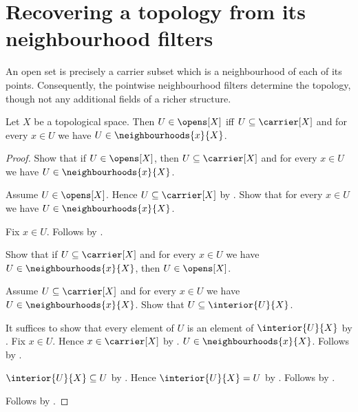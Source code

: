 \section{Recovering a topology from its neighbourhood filters}



An open set is precisely a carrier subset which is a neighbourhood of each
of its points.  Consequently, the pointwise neighbourhood filters determine
the topology, though not any additional fields of a richer structure.

\begin{theorem}\label{open_iff_neighbourhood_of_each_point}
    Let $X$ be a topological space.
    Then $U\in\opens[X]$ iff
        $U\subseteq\carrier[X]$ and
        for every $x\in U$ we have $U\in\neighbourhoods{x}{X}$.
\end{theorem}
\begin{proof}
    Show that if $U\in\opens[X]$, then
        $U\subseteq\carrier[X]$ and
        for every $x\in U$ we have $U\in\neighbourhoods{x}{X}$.
    \begin{subproof}
        Assume $U\in\opens[X]$.
        Hence $U\subseteq\carrier[X]$ by .
        Show that for every $x\in U$ we have
            $U\in\neighbourhoods{x}{X}$.
        \begin{subproof}
            Fix $x\in U$.
            Follows by .
        \end{subproof}
    \end{subproof}

    Show that if $U\subseteq\carrier[X]$ and
        for every $x\in U$ we have $U\in\neighbourhoods{x}{X}$,
        then $U\in\opens[X]$.
    \begin{subproof}
        Assume $U\subseteq\carrier[X]$ and
            for every $x\in U$ we have $U\in\neighbourhoods{x}{X}$.
        Show that $U\subseteq\interior{U}{X}$.
        \begin{subproof}
            It suffices to show that every element of $U$ is an element of
                $\interior{U}{X}$ by .
            Fix $x\in U$.
            Hence $x\in\carrier[X]$ by .
            $U\in\neighbourhoods{x}{X}$.
            Follows by .
        \end{subproof}
        $\interior{U}{X}\subseteq U$ by .
        Hence $\interior{U}{X}=U$ by .
        Follows by .
    \end{subproof}
    Follows by \auto.
\end{proof}

